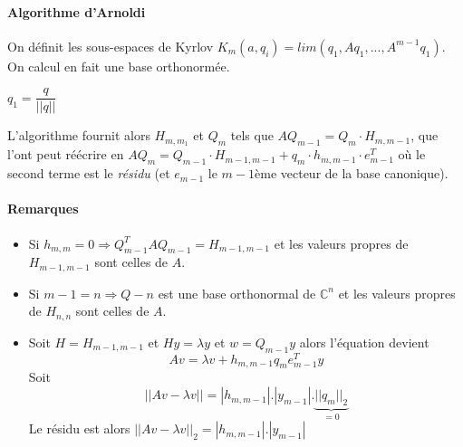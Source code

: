 \documentclass{article}
\begin{document}
\paragraph{Algorithme d'Arnoldi}
On définit les sous-espaces de Kyrlov $K_m(a,q_i) = lim(q_1, Aq_1,...,A^{m-1}q_1)$. On calcul en fait une base orthonormée.

\begin{algorithm}[H]
$q_1 = \dfrac{q}{||q||}$ \\
\end{algorithm}

L'algorithme fournit alors $H_{m,m_1}$ et $Q_m$ tels que $AQ_{m-1}=Q_{m}\cdot H_{m,m-1}$, que l'ont peut réécrire en $AQ_m = Q_{m-1}\cdot H_{m-1,m-1}+q_m\cdot h_{m,m-1} \cdot e_{m-1}^T$ où le second terme est le \emph{résidu} (et $e_{m-1}$ le $m-1$ème vecteur de la base canonique).

\paragraph{Remarques}
\begin{itemize}
\item Si $h_{m,m} = 0 \Rightarrow Q_{m-1}^TAQ_{m-1}=H_{m-1,m-1}$ et les valeurs propres de $H_{m-1,m-1}$ sont celles de $A$.

\item Si $m-1=n \Rightarrow Q-n$ est une base orthonormal de $\mathbb{C}^n$ et les valeurs propres de $H_{n,n}$ sont celles de $A$.

\item Soit $H=H_{m-1,m-1}$ et $Hy=\lambda y$ et $w=Q_{m-1}y$ alors l'équation devient
\[Av=\lambda v + h_{m, m-1}q_m e_{m-1}^T y\]
Soit
\[||Av-\lambda v|| = |h_{m,m-1}|.|y_{m-1}|.\underbrace{||q_m||_2}_{=0}\]
Le résidu est alors $||Av-\lambda v||_2 = |h_{m,m-1}|.|y_{m-1}|$
\end{itemize}
\end{document}

